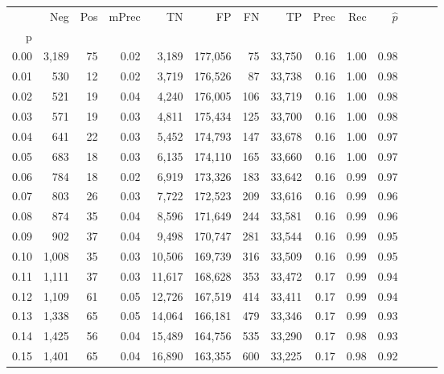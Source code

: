 \begin{tabular}{rrrrrrrrrrrrrr}
\toprule
{} &    Neg &  Pos & mPrec &       TN &       FP &      FN &      TP &  Prec &   Rec & $\hat{p}$ \\
p    &        &      &       &          &          &         &         &       &       &           \\
\midrule
0.00 &  3,189 &   75 &  0.02 &    3,189 &  177,056 &      75 &  33,750 &  0.16 &  1.00 &      0.98 \\
0.01 &    530 &   12 &  0.02 &    3,719 &  176,526 &      87 &  33,738 &  0.16 &  1.00 &      0.98 \\
0.02 &    521 &   19 &  0.04 &    4,240 &  176,005 &     106 &  33,719 &  0.16 &  1.00 &      0.98 \\
0.03 &    571 &   19 &  0.03 &    4,811 &  175,434 &     125 &  33,700 &  0.16 &  1.00 &      0.98 \\
0.04 &    641 &   22 &  0.03 &    5,452 &  174,793 &     147 &  33,678 &  0.16 &  1.00 &      0.97 \\
0.05 &    683 &   18 &  0.03 &    6,135 &  174,110 &     165 &  33,660 &  0.16 &  1.00 &      0.97 \\
0.06 &    784 &   18 &  0.02 &    6,919 &  173,326 &     183 &  33,642 &  0.16 &  0.99 &      0.97 \\
0.07 &    803 &   26 &  0.03 &    7,722 &  172,523 &     209 &  33,616 &  0.16 &  0.99 &      0.96 \\
0.08 &    874 &   35 &  0.04 &    8,596 &  171,649 &     244 &  33,581 &  0.16 &  0.99 &      0.96 \\
0.09 &    902 &   37 &  0.04 &    9,498 &  170,747 &     281 &  33,544 &  0.16 &  0.99 &      0.95 \\
0.10 &  1,008 &   35 &  0.03 &   10,506 &  169,739 &     316 &  33,509 &  0.16 &  0.99 &      0.95 \\
0.11 &  1,111 &   37 &  0.03 &   11,617 &  168,628 &     353 &  33,472 &  0.17 &  0.99 &      0.94 \\
0.12 &  1,109 &   61 &  0.05 &   12,726 &  167,519 &     414 &  33,411 &  0.17 &  0.99 &      0.94 \\
0.13 &  1,338 &   65 &  0.05 &   14,064 &  166,181 &     479 &  33,346 &  0.17 &  0.99 &      0.93 \\
0.14 &  1,425 &   56 &  0.04 &   15,489 &  164,756 &     535 &  33,290 &  0.17 &  0.98 &      0.93 \\
0.15 &  1,401 &   65 &  0.04 &   16,890 &  163,355 &     600 &  33,225 &  0.17 &  0.98 &      0.92 \\

\end{tabular}
